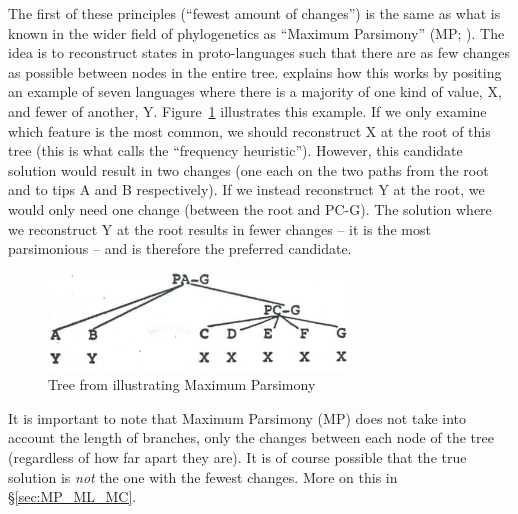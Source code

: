 \documentclass[12pt,letterpaper]{article}
\begin{document}
The first of these principles (``fewest amount of changes'') is the same as what is known in the wider field of phylogenetics as ``Maximum Parsimony'' (MP; \citealt{felsenstein2004inferring}). The idea is to reconstruct states in proto-languages such that there are as few changes as possible between nodes in the entire tree. \citet[17--22]{clark1973aspects} explains how this works by positing an example of seven languages where there is a majority of one kind of value, X, and fewer of another, Y. Figure~\ref{fig:clark_tree} illustrates this example. If we only examine which feature is the most common, we should reconstruct X at the root of this tree (this is what \citealt{goldstein_2022} calls the ``frequency heuristic''). However, this candidate solution would result in two changes (one each on the two paths from the root and to tips A and B respectively). If we instead reconstruct Y at the root, we would only need one change (between the root and PC-G). The solution where we reconstruct Y at the root results in fewer changes -- it is the most parsimonious -- and is therefore the preferred candidate.
 
\begin{figure}[ht]
\centering
\includegraphics[width=8cm]{illustrations/Clark_1977_tree.png}
\caption{{Tree from \citet[19]{clark1973aspects} illustrating Maximum Parsimony}}
\label{fig:clark_tree}
\end{figure}

It is important to note that Maximum Parsimony (MP) does not take into account the length of branches, only the changes between each node of the tree (regardless of how far apart they are). It is of course possible that the true solution is \textit{not} the one with the fewest changes. More on this in §\ref{sec:MP_ML_MC}.
\end{document}
